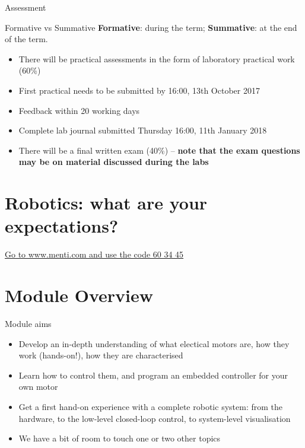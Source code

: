 \documentclass[compress]{beamer}
\begin{document}
\begin{frame}{Assessment}
    \begin{exampleblock}{Formative vs Summative}
        \textbf{Formative}: during the term; \textbf{Summative}: at the end of
        the term.
    \end{exampleblock}

    \begin{itemize}
        \item There will be practical assessments in the form of laboratory
            practical work (60\%)
        \item First practical needs to be submitted by 16:00, 13th October 2017
        \item Feedback within 20 working days
        \item Complete lab journal submitted Thursday 16:00, 11th January 2018
        \item There will be a final written exam (40\%) -- \textbf{note that the
            exam questions may be on material discussed during the labs}
    \end{itemize}

\end{frame}


\section{Robotics: what are your expectations?}

\begin{frame}[plain]
    \begin{center}
        \Large
    \href{https://www.mentimeter.com/s/d42456cc370aa465642c7e815a68646b/4fdc61757b92}{Go to www.menti.com and use the code 60 34 45}
    \end{center}
\end{frame}



\section{Module Overview}



\begin{frame}{Module aims}
    \begin{itemize}
        \item<+-> Develop an in-depth understanding of what electical motors are,
            how they work (hands-on!), how they are characterised
        \item<+-> Learn how to control them, and program an embedded controller
            for your own motor
        \item<+-> Get a first hand-on experience with a complete robotic system:
            from the hardware, to the low-level closed-loop control, to
            system-level visualisation
        \item<+-> We have a bit of room to touch one or two other topics
    \end{itemize}
\end{frame}
\end{document}

